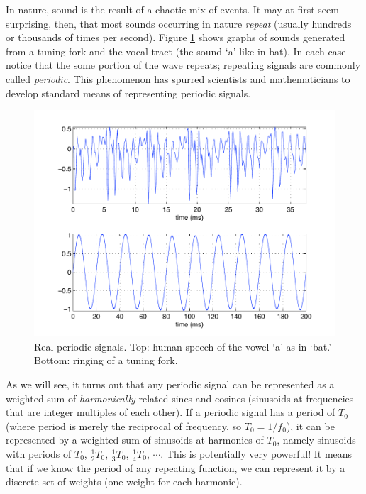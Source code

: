 In nature, sound is the result of a chaotic mix of events. It may at first seem surprising, then, that most sounds occurring in nature \emph{repeat} (usually hundreds or thousands of times per second). Figure \ref{fg:periodicexample} shows graphs of sounds generated from a tuning fork and the vocal tract (the sound `a' like in bat). In each case notice that the some portion of the wave repeats; repeating signals are commonly called \emph{periodic}. This phenomenon has spurred scientists and mathematicians to develop standard means of representing periodic signals. 
\begin{figure}
\centerline{\includegraphics[width=\textwidth]{ch-physical/periodic-examples}}
\caption[Real periodic signals]{Real periodic signals. Top: human speech of the vowel `a' as in `bat.' Bottom: ringing of a tuning fork. \label{fg:periodicexample}}
\end{figure}

As we will see, it turns out that any periodic signal can be
represented as a weighted sum of \emph{harmonically} 
related sines and cosines (sinusoids at frequencies that are integer
multiples of each other). If a periodic signal has a period of $T_0$
(where period is merely the reciprocal of frequency, so $T_0 =
1/f_0$), it can be represented by a weighted sum of sinusoids at
harmonics of $T_0$, namely sinusoids with periods of $T_0$,
$\frac{1}{2}T_0$, $\frac{1}{3}T_0$, $\frac{1}{4}T_0$, $\cdots$. This
is potentially very powerful! It means that if we know the period of
any repeating function, we can represent it by a discrete set of
weights (one weight for each harmonic).

